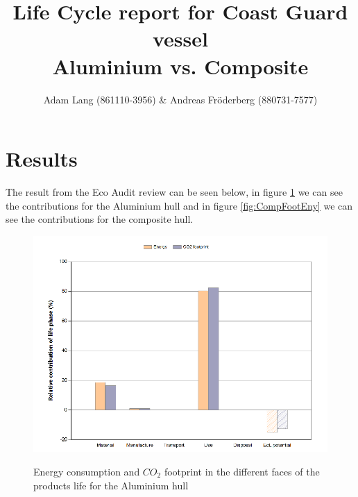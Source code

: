 \documentclass[12pt,a4paper]{article}
\title{Life Cycle report for Coast Guard vessel \\ Aluminium vs.
Composite}
\author{Adam Lang (861110-3956) \& Andreas Fr\"oderberg (880731-7577)}
\begin{document}
\maketitle

\section{Results}

The result from the Eco Audit review can be seen below, in figure
\ref{fig:AluFootEny} we can see the contributions for the Aluminium hull
and in figure \ref{fig:CompFootEny} we can see the contributions for the
composite hull.

\begin{center}
    \begin{figure}[H]
      \centering
      \includegraphics[scale=0.6]{AluFootEny.png}
      \label{fig:AluFootEny}
      \caption{Energy consumption and $CO_2$ footprint in the different
      faces of the products life for the Aluminium hull}
    \end{figure}
\end{center}
\end{document}
